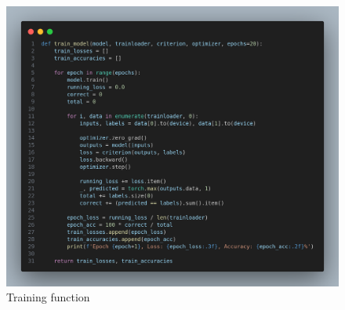 \documentclass[a4paper,12pt]{article}
\begin{document}
\begin{figure}
    \centering
    \includegraphics[width=0.7\linewidth]{images/train_func.png}
    \caption{Training function}
    \label{fig:enter-label}
\end{figure}
\end{document}
